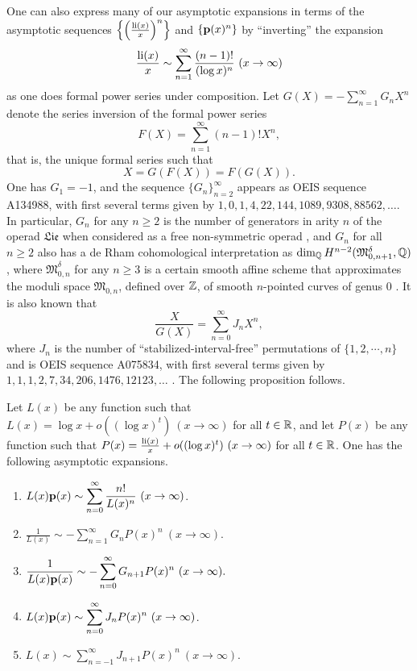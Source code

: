 \documentclass[12pt]{article}
\begin{document}
One can also express many of our asymptotic expansions in terms of the asymptotic sequences
 $\left\{\left(\frac{\operatorname{li}(x)}{x}\right)^n\right\}$ and $\{{\mathbf p}(x)^n\}$ by ``inverting'' the expansion 
$$\frac{\operatorname{li}(x)}{x} \sim \sum_{n = 1}^\infty \frac{(n-1)!}{(\log x)^n} \ (x \to \infty)$$ 
as one does formal  power series under composition.  Let $G(X) = - \sum_{n= 1}^\infty G_n X^n$ denote  the series inversion of the formal power series $$F(X) = \sum_{n = 1}^\infty (n-1)! X^{n},$$
that is, the unique formal series  such that 
$$X = G(F(X)) = F(G(X)).$$
One has $G_1 = -1$, and the sequence $\{G_n\}_{n = 2}^\infty$ appears as OEIS sequence A134988, with first several terms given by  $1, 0, 1, 4, 22, 144, 1089, 9308, 88562, \ldots$.  In particular, $G_n$ for any $n \geq 2$ is the number of generators in arity $n$ of the operad $\mathfrak{Lie}$ when considered as a free non-symmetric operad \cite{salv}, and $G_n$ for all $n \geq 2$ also has a de Rham cohomological interpretation as $\dim_{\mathbb Q} H^{n-2}({\mathfrak M}^\delta_{0,n+1}, {\mathbb Q})$, where ${\mathfrak M}^\delta_{0,n}$ for any $n \geq 3$ is a certain smooth affine scheme that approximates the moduli space ${\mathfrak M}_{0,n}$, defined over ${\mathbb Z}$, of smooth $n$-pointed curves of genus 0  \cite{brow}.    It is also known that
$$\frac{X}{G(X)} = \sum_{n = 0}^\infty J_nX^n,$$
where $J_n$ is the number of ``stabilized-interval-free'' permutations of $\{1, 2, \cdots , n\}$ and is OEIS sequence A075834, with first several terms given by $1,1,1,2,7,34, 206,1476, 12123,\ldots$ \cite{call}.   The following proposition follows.



\begin{proposition}
Let $L(x)$ be any function such that $L(x) = \log x + o ((\log x)^t) \  (x \to \infty)$ for all $t \in {\mathbb R}$, and let $P(x)$ be any function such that $P(x) = \frac{\operatorname{li}(x)}{x} + o ((\log x)^t) \  (x \to \infty)$ for all $t \in {\mathbb R}$.  One has the following asymptotic expansions.
\begin{enumerate}
\item  $\displaystyle L(x) {\mathbf p}(x) \sim \sum_{n = 0}^\infty  \frac{n!}{L(x)^n} \ (x \to \infty)$.
\item $\displaystyle \frac{1}{L(x)} \sim -\sum_{n = 1}^\infty G_n P(x)^n \ (x \to \infty)$.
\item $\displaystyle \frac{1}{L(x){\mathbf p}(x)} \sim -\sum_{n = 0}^\infty G_{n+1} P(x)^n \ (x \to \infty).$
\item $\displaystyle {L(x) {\mathbf p}(x)} \sim   \sum_{n = 0}^\infty J_n P(x)^n \ (x \to \infty)$.
\item $\displaystyle {L(x)} \sim   \sum_{n = -1}^\infty J_{n+1} P(x)^n \ (x \to \infty)$.
\end{enumerate}
\end{proposition}
\end{document}
